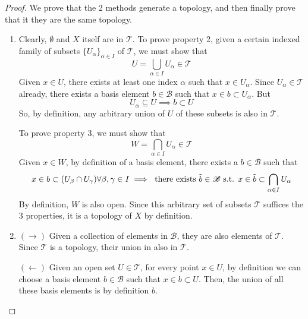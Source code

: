\documentclass{article}
\begin{document}
    \begin{proof}
      We prove that the 2 methods generate a topology, and then finally prove that it they are the same topology. 
      \begin{enumerate}
        \item Clearly, $\emptyset$ and $X$ itself are in $\mathscr{T}$. To prove property 2, given a certain indexed family of subsets $\{U_\alpha\}_{\alpha \in I}$ of $\mathscr{T}$, we must show that 
        \begin{equation}
          U = \bigcup_{\alpha \in I} U_\alpha \in \mathscr{T}
        \end{equation}
        Given $x \in U$, there exists at least one index $\alpha$ such that $x \in U_\alpha$. Since $U_\alpha \in \mathscr{T}$ already, there exists a basis element $b \in \mathscr{B}$ such that $x \in b \subset U_\alpha$. But 
        \begin{equation}
          U_\alpha \subseteq U \implies b \subset U
        \end{equation}
        So, by definition, any arbitrary union of $U$ of these subsets is also in $\mathscr{T}$. 

        To prove property 3, we must show that 
        \begin{equation}
          W = \bigcap_{\alpha \in I} U_\alpha \in \mathscr{T}
        \end{equation}
        Given $x \in W$, by definition of a basis element, there exists a $b \in \mathscr{B}$ such that 
        \begin{equation}
          x \in b \subset (U_\beta \cap U_\gamma) \forall \beta, \gamma \in I \implies \text{ there exists } \Tilde{b} \in \mathscr{B} \text{ s.t. } x \in \Tilde{b} \subset \bigcap_{\alpha \in I} U_\alpha
        \end{equation}
        By definition, $W$ is also open. Since this arbitrary set of subsets $\mathscr{T}$ suffices the 3 properties, it is a topology of $X$ by definition. 

        \item $(\rightarrow)$ Given a collection of elements in $\mathscr{B}$, they are also elements of $\mathscr{T}$. Since $\mathscr{T}$ is a topology, their union in also in $\mathscr{T}$. 

        $(\leftarrow)$ Given an open set $U \in \mathscr{T}$, for every point $x \in U$, by definition we can choose a basis element $b \in \mathscr{B}$ such that $x \in b \subset U$. Then, the union of all these basis elements is by definition $b$. 
          
      \end{enumerate}
    \end{proof}
\end{document}
